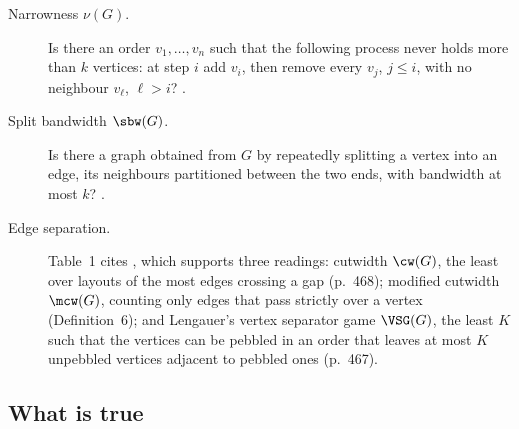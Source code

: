 \begin{description}
\item[Narrowness $\nu(G)$.] Is there an order $v_1,\dots,v_n$ such that the
  following process never holds more than $k$ vertices: at step $i$ add $v_i$,
  then remove every $v_j$, $j\le i$, with no neighbour $v_\ell$, $\ell>i$?
  \citep[\S2]{LY2002ref11}.
\item[Split bandwidth $\sbw(G)$.] Is there a graph obtained from $G$ by
  repeatedly splitting a vertex into an edge, its neighbours partitioned between
  the two ends, with bandwidth at most $k$? \citep[\S3.2]{LY2002ref12}.
\item[Edge separation.] Table~1 cites \citet{LY2002ref14}, which supports three
  readings: cutwidth $\cw(G)$, the least over layouts of the most edges crossing
  a gap (p.~468); modified cutwidth $\mcw(G)$, counting only edges that pass
  strictly over a vertex (Definition~6); and Lengauer's vertex separator game
  $\VSG(G)$, the least $K$ such that the vertices can be pebbled in an order that
  leaves at most $K$ unpebbled vertices adjacent to pebbled ones (p.~467).
\end{description}

\subsection{What is true}

